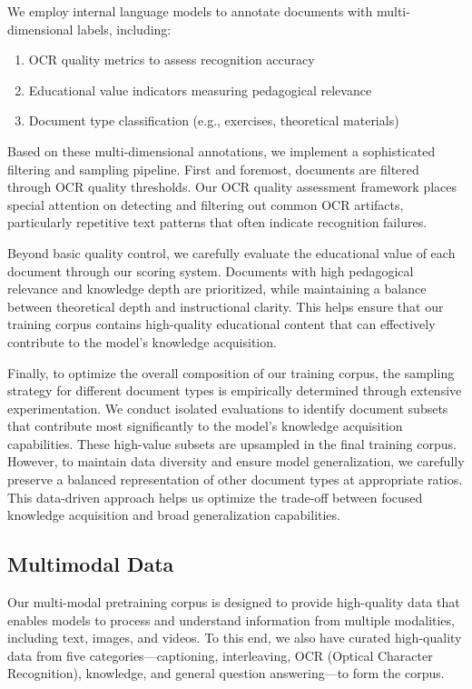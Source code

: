 \documentclass{article}
\begin{document}
We employ internal language models to annotate documents with multi-dimensional labels, including:
\begin{enumerate}
    \item OCR quality metrics to assess recognition accuracy
    \item Educational value indicators measuring pedagogical relevance
    \item Document type classification (e.g., exercises, theoretical materials)
\end{enumerate}

Based on these multi-dimensional annotations, we implement a sophisticated filtering and sampling pipeline. First and foremost, documents are filtered through OCR quality thresholds. Our OCR quality assessment framework places special attention on detecting and filtering out common OCR artifacts, particularly repetitive text patterns that often indicate recognition failures.

Beyond basic quality control, we carefully evaluate the educational value of each document through our scoring system. Documents with high pedagogical relevance and knowledge depth are prioritized, while maintaining a balance between theoretical depth and instructional clarity. This helps ensure that our training corpus contains high-quality educational content that can effectively contribute to the model's knowledge acquisition.

Finally, to optimize the overall composition of our training corpus, the sampling strategy for different document types is empirically determined through extensive experimentation. We conduct isolated evaluations to identify document subsets that contribute most significantly to the model's knowledge acquisition capabilities. These high-value subsets are upsampled in the final training corpus. However, to maintain data diversity and ensure model generalization, we carefully preserve a balanced representation of other document types at appropriate ratios. This data-driven approach helps us optimize the trade-off between focused knowledge acquisition and broad generalization capabilities.


\subsection{Multimodal Data}

Our multi-modal pretraining corpus is designed to provide high-quality data that enables models to process and understand information from multiple modalities, including text, images, and videos. 
To this end, we also have curated high-quality data from five categories—captioning, interleaving, OCR (Optical Character Recognition), knowledge, and general question answering—to form the corpus.
\end{document}

